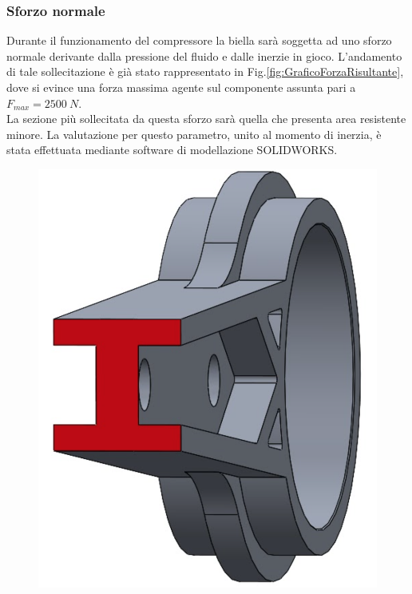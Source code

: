 \subsubsection{Sforzo normale}
Durante il funzionamento del compressore la biella sarà soggetta ad uno sforzo normale derivante dalla pressione del fluido e dalle inerzie in gioco. L'andamento di tale sollecitazione è già stato rappresentato in Fig.\ref{fig:GraficoForzaRisultante}, dove si evince una forza massima agente sul componente assunta pari a $F_{max}=2500\ N$.\\
La sezione più sollecitata da questa sforzo sarà quella che presenta area resistente minore. La valutazione per questo parametro, unito al momento di inerzia, è stata effettuata mediante software di modellazione SOLIDWORKS. 
\begin{figure}[h]
    \centering
    \includegraphics[scale=0.3]{Immagini/SezioneMinoreBiella1.png}

\end{figure}
